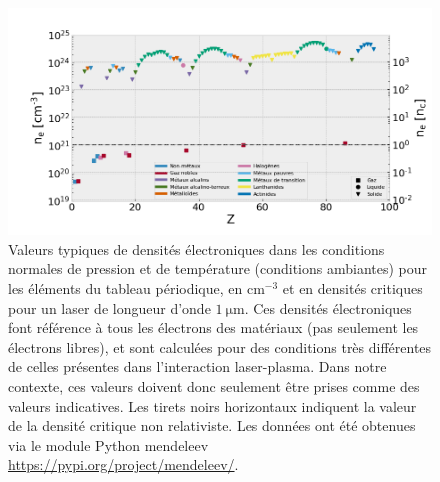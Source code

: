\begin{refsection}
\begin{figure}[hbtp]
    \centering
    \includegraphics[width=0.85\linewidth]{2-laser/ne_Z.png}
    \caption{Valeurs typiques de densités électroniques dans les conditions normales de pression et de température (conditions ambiantes) pour les éléments du tableau périodique, en $\si{\cm^{-3}}$ et en densités critiques pour un laser de longueur d'onde $1~ \si{\um}$. Ces densités électroniques font référence à tous les électrons des matériaux (pas seulement les électrons libres), et sont calculées pour des conditions très différentes de celles présentes dans l'interaction laser-plasma. Dans notre contexte, ces valeurs doivent donc seulement être prises comme des valeurs indicatives. Les tirets noirs horizontaux indiquent la valeur de la densité critique non relativiste. Les données ont été obtenues via le module Python mendeleev \url{https://pypi.org/project/mendeleev/}.}
    \label{fig:2-densite_materiaux}
\end{figure}


\end{refsection}
